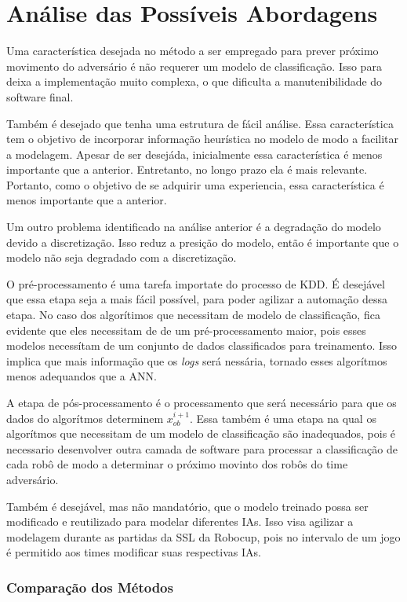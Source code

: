 \chapter{Análise das Possíveis Abordagens}\label{cap:anal_abordagens}

Uma característica desejada no método a ser empregado para prever próximo
movimento do adversário é não requerer um modelo de classificação. Isso para
deixa a implementação muito complexa, o que dificulta a manutenibilidade do
software final.

Também é desejado que tenha uma estrutura de fácil análise. Essa característica
tem o objetivo de incorporar informação heurística no modelo de modo a facilitar
a modelagem. Apesar de ser desejáda, inicialmente essa característica é menos
importante que a anterior. Entretanto, no longo prazo ela é mais relevante.
Portanto, como o objetivo de se adquirir uma experiencia, essa característica é
menos importante que a anterior.

Um outro problema identificado na análise anterior é a degradação do modelo
devido a discretização. Isso reduz a presição do modelo, então é importante que
o modelo não seja degradado com a discretização.

O pré-processamento é uma tarefa importate do processo de KDD. É desejável que
essa etapa seja a mais fácil possível, para poder agilizar a automação dessa
etapa. No caso dos algorítimos que necessitam de modelo de classificação, fica
evidente que eles necessitam de de um pré-processamento maior, pois esses
modelos necessítam de um conjunto de dados classificados para treinamento.
Isso implica que mais informação que os \textit{logs} será nessária, tornado
esses algorítmos menos adequandos que a ANN.

A etapa de pós-processamento é o processamento que será necessário para que os
dados do algorítmos determinem $x_{ob}^{i+1}$. Essa também é uma etapa na qual
os algorítmos que necessitam de um modelo de classificação são inadequados, pois
é necessario desenvolver outra camada de software para processar a classificação
de cada robô de modo a determinar o próximo movinto dos robôs do time
adversário.

Também é desejável, mas não mandatório, que o modelo treinado possa ser
modificado e reutilizado para modelar diferentes IAs. Isso visa
agilizar a modelagem durante as partidas da SSL da Robocup, pois no intervalo
de um jogo é permitido aos times modificar suas respectivas IAs.

\subsection{Comparação dos Métodos}

